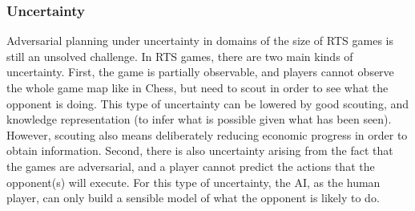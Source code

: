\documentclass{llncs}
\begin{document}
\subsubsection*{Uncertainty}
Adversarial planning under  uncertainty in domains of the  size of RTS
games is  still an unsolved  challenge.  In  RTS games, there  are two
main kinds  of uncertainty. First,  the game is  partially observable,
and players  cannot observe the  whole game  map like in  Chess, but
need to scout in order to see what the opponent is doing. This type of
uncertainty   can  be   lowered  by   good  scouting,   and  knowledge
representation  (to  infer  what  is  possible  given  what  has  been
seen). However, scouting also means deliberately reducing economic progress in order to obtain information.
Second,  there is also  uncertainty arising from the  fact that
the games  are adversarial,  and a player  cannot predict  the actions
that the opponent(s)  will execute. For this type  of uncertainty, the
AI, as the human  player, can only build a sensible  model of what the
opponent is likely to do.
\end{document}
